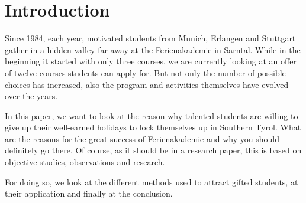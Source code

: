 \section{Introduction}
Since 1984, each year, motivated students from Munich, Erlangen and Stuttgart gather in a hidden valley far away at the Ferienakademie in Sarntal. While in the beginning it started with only three courses, we are currently looking at an offer of twelve courses students can apply for. But not only the number of possible choices has increased, also the program and activities themselves have evolved over the years. 

In this paper, we want to look at the reason why talented students are willing to give up their well-earned holidays to lock themselves up in Southern Tyrol. What are the reasons for the great success of Ferienakademie and why you should definitely go there. Of course, as it should be in a research paper, this is based on objective studies, observations and research.

For doing so, we look at the different methods used to attract gifted students, at their application and finally at the conclusion.


